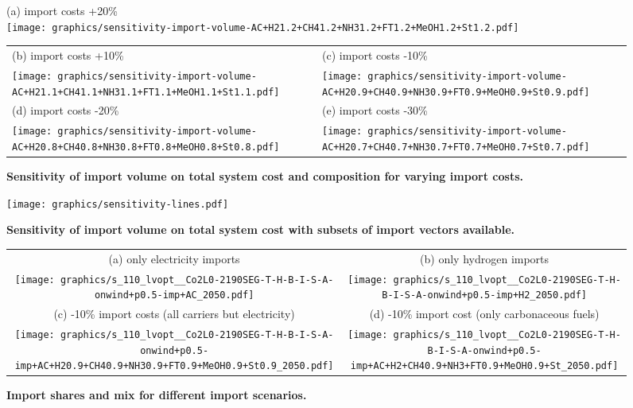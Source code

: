 \documentclass[5p,10pt]{elsarticle}
\begin{document}
\begin{figure*}
    \small
    (a) import costs +20\% \\
    \texttt{[image: graphics/sensitivity-import-volume-AC+H21.2+CH41.2+NH31.2+FT1.2+MeOH1.2+St1.2.pdf]}
    \begin{tabular}{ll}
        (b) import costs +10\% & (c) import costs -10\% \\
        \texttt{[image: graphics/sensitivity-import-volume-AC+H21.1+CH41.1+NH31.1+FT1.1+MeOH1.1+St1.1.pdf]} &
        \texttt{[image: graphics/sensitivity-import-volume-AC+H20.9+CH40.9+NH30.9+FT0.9+MeOH0.9+St0.9.pdf]} \\
        (d) import costs -20\% & (e) import costs -30\% \\
        \texttt{[image: graphics/sensitivity-import-volume-AC+H20.8+CH40.8+NH30.8+FT0.8+MeOH0.8+St0.8.pdf]} &
        \texttt{[image: graphics/sensitivity-import-volume-AC+H20.7+CH40.7+NH30.7+FT0.7+MeOH0.7+St0.7.pdf]}
    \end{tabular}
    \caption{\textbf{Sensitivity of import volume on total system cost and composition for varying import costs.}}
    \label{fig:si:volume}
\end{figure*}


\begin{figure*}
    \texttt{[image: graphics/sensitivity-lines.pdf]}
    \caption{\textbf{Sensitivity of import volume on total system cost with subsets of import vectors available.}}
    \label{fig:si:volume-subsets}
\end{figure*}

\begin{figure*}
    \footnotesize
    \begin{tabular}{cc}
        (a) only electricity imports & (b) only hydrogen imports \\
        \texttt{[image: graphics/s\_110\_lvopt\_\_Co2L0-2190SEG-T-H-B-I-S-A-onwind+p0.5-imp+AC\_2050.pdf]} &
        \texttt{[image: graphics/s\_110\_lvopt\_\_Co2L0-2190SEG-T-H-B-I-S-A-onwind+p0.5-imp+H2\_2050.pdf]} \\
        (c) -10\% import costs (all carriers but electricity) & (d) -10\% import cost (only carbonaceous fuels) \\
        \texttt{[image: graphics/s\_110\_lvopt\_\_Co2L0-2190SEG-T-H-B-I-S-A-onwind+p0.5-imp+AC+H20.9+CH40.9+NH30.9+FT0.9+MeOH0.9+St0.9\_2050.pdf]} &
        \texttt{[image: graphics/s\_110\_lvopt\_\_Co2L0-2190SEG-T-H-B-I-S-A-onwind+p0.5-imp+AC+H2+CH40.9+NH3+FT0.9+MeOH0.9+St\_2050.pdf]} \\
    \end{tabular}
    \caption{\textbf{Import shares and mix for different import scenarios.}}
    \label{fig:si:import-shares}
\end{figure*}
\end{document}

